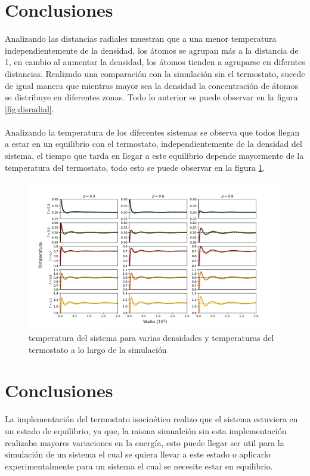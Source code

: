 \documentclass[reprint,amsmath,amssymb,aps,]{revtex4-2}
\begin{document}
\section{Conclusiones}
Analizando las distancias radiales muestran que a una menor temperatura independientemente de la densidad, los átomos se agrupan más a la distancia de 1, en cambio
al aumentar la densidad, los átomos tienden a agruparse en diferntes distancias.
Realizndo una comparación con la simulación sin el termostato, sucede de igual manera que mientras mayor sea la densidad
la concentración de átomos se distribuye en diferentes zonas. Todo lo anterior se puede observar en la figura \ref{fig:disradial}.\\\\

Analizando la temperatura de los diferentes sistemas se observa que todos llegan a estar en un equilibrio con el termostato, independientemente
de la densidad del sistema, el tiempo que tarda en llegar a este equilibrio depende mayormente de la temperatura del termostato, todo esto se puede observar
en la figura \ref{fig:temp}.
\begin{figure}[H]
    \hspace{-0.75cm}
    \includegraphics[scale=0.275]{Images/Temp.png}
    \caption{temperatura del sistema para varias densidades y temperaturas del termostato a lo largo de la simulación}
    \label{fig:temp}
    \end{figure}
\section{Conclusiones}
La implementación del termostato isocinético realizo que el sistema estuviera en un estado de equilibrio, ya que, la misma simualción sin esta implementación
realizaba mayores variaciones en la energía, esto puede llegar ser util para la simulación de un sistema el cual se quiera llevar a este estado o aplicarlo experimentalmente
para un sistema el cual se necesite estar en equilibrio.
\end{document}
